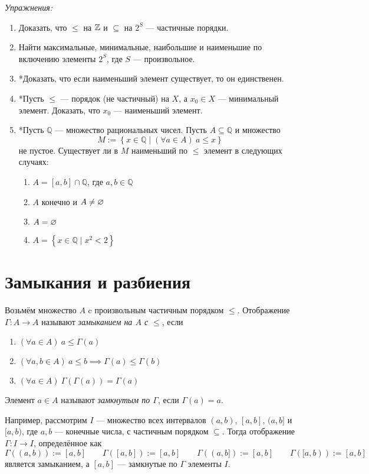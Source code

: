 \newcommand\Q{\mathbb Q}
\vspace{1em}
{\it Упражнения:}
\begin{enumerate}
	\item{}Доказать, что $\leq$ на $\mathbb Z$ и $\subseteq$ на $2^{S}$ --- частичные порядки.
	\item{}Найти максимальные, минимальные, наибольшие и
		наименьшие по включению элементы $2^{S}$, где $S$ --- произвольное.
	\item{}*Доказать, что если наименьший элемент существует, то
		он единственен.
	\item{}*Пусть $\leq$ --- порядок (не частичный) на $X$, а $x_0\in X$ --- минимальный
		элемент. Доказать, что $x_0$ --- наименьший элемент.
	\item{}*Пусть $\Q$ --- множество рациональных чисел.
		Пусть $A\subseteq \Q$ и множество
		\[
			M:=\left\{x\in \Q\;\big|\;(\forall a\in A)~a\leq x\right\}
		\]
		не пустое. Существует ли в $M$ наименьший по $\leq$ элемент
		в следующих случаях:
		\begin{multicols}{2}
			\begin{enumerate}
				\item{}$A=[a,b]\cap\Q$, где $a,b\in\Q$
				\item{}$A$ конечно и $A\neq\varnothing$
				\item{}$A=\varnothing$
				\item{}$A=\left\{x\in\Q\;\big|\; x^{2}<2\right\}$
			\end{enumerate}
		\end{multicols}
\end{enumerate}

\section{Замыкания и разбиения}

Возьмём множество $A$ c произвольным частичным порядком $\leq$. Отображение
$\Gamma:A\to A$ называют {\it замыканием на $A$ с $\leq$}, если
\begin{enumerate}
	\item{}$(\forall a\in A)~a\leq\Gamma(a)$
	\item{}$(\forall a,b\in A)~a\leq b\implies \Gamma(a)\leq \Gamma(b)$
	\item{}$(\forall a\in A)~\Gamma(\Gamma(a))=\Gamma(a)$
\end{enumerate}
Элемент ${a\in A}$ называют {\it замкнутым по $\Gamma$}, если ${\Gamma(a)=a}$.

Например, рассмотрим $I$ --- множество всех интервалов $(a,b)$, $[a,b]$, $(a,b]$
и $[a,b)$, где $a,b$ --- конечные числа, с частичным порядком $\subseteq$.
Тогда отображение $\Gamma:I\to I$, определённое как
\[
	\Gamma((a,b)):=[a,b]\qquad \Gamma([a,b]):=[a,b]\qquad
	\Gamma((a,b]):=[a,b]\qquad \Gamma([a,b)):=[a,b]
\]
является замыканием, а $[a,b]$ --- замкнутые по $\Gamma$ элементы $I$.

